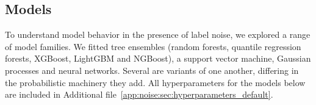 \subsection{Models}

To understand model behavior in the presence of label noise, we explored a range of model families. We fitted tree ensembles (random forests, quantile regression forests, XGBoost, LightGBM and NGBoost), a support vector machine, Gaussian processes and neural networks. Several are variants of one another, differing in the probabilistic machinery they add. All hyperparameters for the models below are included in Additional file~\ref{app:noise:sec:hyperparameters_default}.


